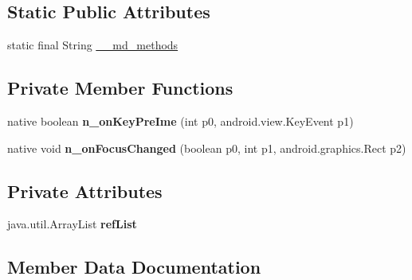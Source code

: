 \subsection*{Static Public Attributes}
\begin{DoxyCompactItemize}
\item 
static final String \hyperlink{classmd5b60ffeb829f638581ab2bb9b1a7f4f3f_1_1EntryCellEditText_a12054a03c17af4ab15a7d12108ce682a}{\+\_\+\+\_\+md\+\_\+methods}
\end{DoxyCompactItemize}
\subsection*{Private Member Functions}
\begin{DoxyCompactItemize}
\item 
\mbox{\label{classmd5b60ffeb829f638581ab2bb9b1a7f4f3f_1_1EntryCellEditText_abbfea7c47615a8f58683006cb0629287}} 
native boolean {\bfseries n\+\_\+on\+Key\+Pre\+Ime} (int p0, android.\+view.\+Key\+Event p1)
\item 
\mbox{\label{classmd5b60ffeb829f638581ab2bb9b1a7f4f3f_1_1EntryCellEditText_a448e938035b755ec2d8f82eecf7787e5}} 
native void {\bfseries n\+\_\+on\+Focus\+Changed} (boolean p0, int p1, android.\+graphics.\+Rect p2)
\end{DoxyCompactItemize}
\subsection*{Private Attributes}
\begin{DoxyCompactItemize}
\item 
\mbox{\label{classmd5b60ffeb829f638581ab2bb9b1a7f4f3f_1_1EntryCellEditText_a2f5977b580ca5011d855f06a7ba1101b}} 
java.\+util.\+Array\+List {\bfseries ref\+List}
\end{DoxyCompactItemize}


\subsection{Member Data Documentation}
\mbox{\label{classmd5b60ffeb829f638581ab2bb9b1a7f4f3f_1_1EntryCellEditText_a12054a03c17af4ab15a7d12108ce682a}} 
